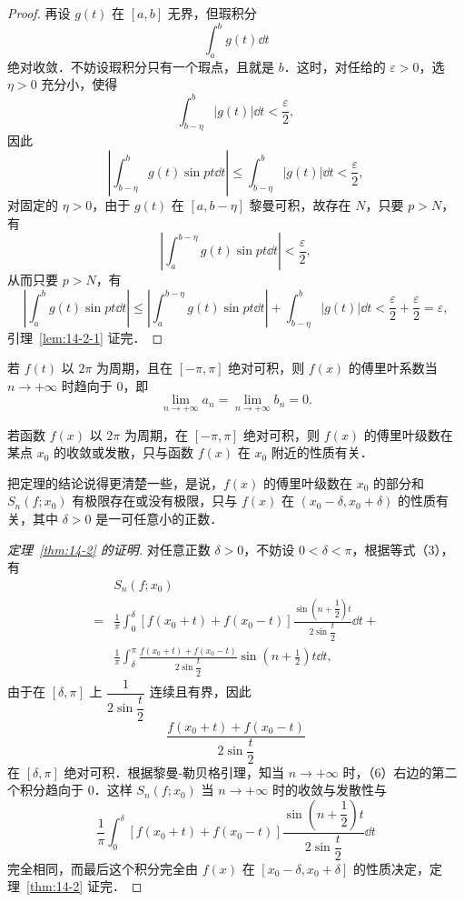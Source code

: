 \begin{proof}
再设 $g(t)$ 在 $[a,b]$ 无界，但瑕积分
\[
\int_{a}^{b}g(t)\dd t
\]
绝对收敛．不妨设瑕积分只有一个瑕点，且就是 $b$．这时，对任给的 $\varepsilon>0$，选 $\eta>0$ 充分小，使得
\[
\int_{b-\eta}^{b}\left|g(t)\right|\dd t<\frac{\varepsilon}{2},
\]
因此
\[
\left|\int_{b-\eta}^{b}g(t)\sin pt\dd t\right|\leqslant\int_{b-\eta}^{b}\left|g(t)\right|\dd t<\frac{\varepsilon}{2},
\]
对固定的 $\eta>0$，由于 $g(t)$ 在 $[a,b-\eta]$ 黎曼可积，故存在 $N$，只要 $p>N$，有
\[
\left|\int_{a}^{b-\eta}g(t)\sin pt\dd t\right|<\frac{\varepsilon}{2},
\]
从而只要 $p>N$，有
\[
\left|\int_{a}^{b}g(t)\sin pt\dd t\right|\leqslant\left|\int_{a}^{b-\eta}g(t)\sin pt\dd t\right|+\int_{b-\eta}^{b}\left|g(t)\right|\dd t<\frac{\varepsilon}{2}+\frac{\varepsilon}{2}=\varepsilon,
\]
引理~\ref{lem:14-2-1} 证完．
\end{proof}

\begin{corollary}\label{cor:14-2-1}
若 $f(t)$ 以 $2\pi$ 为周期，且在 $[-\pi,\pi]$ 绝对可积，则 $f(x)$ 的傅里叶系数当 $n\to+\infty$ 时趋向于 $0$，即
\[
\lim_{n\to+\infty}a_{n}=\lim_{n\to+\infty}b_{n}=0.
\]
\end{corollary}

\begin{theorem}[黎曼局部化定理]\label{thm:14-2}
若函数 $f(x)$ 以 $2\pi$ 为周期，在 $[-\pi,\pi]$ 绝对可积，则 $f(x)$ 的傅里叶级数在某点 $x_{0}$ 的收敛或发散，只与函数 $f(x)$ 在 $x_{0}$ 附近的性质有关．
\end{theorem}

把定理的结论说得更清楚一些，是说，$f(x)$ 的傅里叶级数在 $x_{0}$ 的部分和 $S_{n}(f;x_{0})$ 有极限存在或没有极限，只与 $f(x)$ 在 $(x_{0}-\delta,x_{0}+\delta)$ 的性质有关，其中 $\delta>0$ 是一可任意小的正数．

\begin{proof}[定理~\ref{thm:14-2} 的证明]
对任意正数 $\delta>0$，不妨设 $0<\delta<\pi$，根据等式（3），有
\begin{equation}
\begin{aligned}
&S_{n}(f;x_{0})\\
={}&\frac{1}{\pi}\int_{0}^{\delta}\left[f(x_{0}+t)+f(x_{0}-t)\right]\frac{\sin\left(n+\dfrac{1}{2}\right)t}{2\sin\dfrac{t}{2}}\dd t+\\
&\frac{1}{\pi}\int_{\delta}^{\pi}\frac{f(x_{0}+t)+f(x_{0}-t)}{2\sin\dfrac{t}{2}}\sin\left(n+\frac{1}{2}\right)t\dd t,
\end{aligned}
\tag{6}
\end{equation}
由于在 $[\delta,\pi]$ 上 $\dfrac{1}{2\sin\dfrac{t}{2}}$ 连续且有界，因此
\[
\frac{f(x_{0}+t)+f(x_{0}-t)}{2\sin\dfrac{t}{2}}
\]
在 $[\delta,\pi]$ 绝对可积．根据黎曼-勒贝格引理，知当 $n\to+\infty$ 时，（6）右边的第二个积分趋向于 $0$．这样 $S_{n}(f;x_{0})$ 当 $n\to+\infty$ 时的收敛与发散性与
\[
\frac{1}{\pi}\int_{0}^{\delta}\left[f(x_{0}+t)+f(x_{0}-t)\right]\frac{\sin\left(n+\dfrac{1}{2}\right)t}{2\sin\dfrac{t}{2}}\dd t
\]
完全相同，而最后这个积分完全由 $f(x)$ 在 $[x_{0}-\delta,x_{0}+\delta]$ 的性质决定，定理~\ref{thm:14-2} 证完．
\end{proof}

